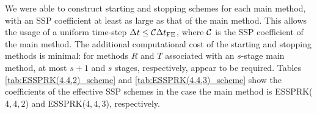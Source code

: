 We were able to construct starting and stopping schemes for each main 
method, with an SSP coefficient at least as large as that of the main method.
This allows the usage of a uniform time-step $\Delta t \leq \mathcal{C}\Delta t_{\textnormal{FE}}$, 
where $\mathcal{C}$ is the SSP coefficient of the main method.
The additional computational cost
of the starting and stopping methods is minimal:
for methods $R$ and $T$ associated with an $s$-stage main method,
at most $s + 1$ and $s$ stages, respectively, appear to be required.
Tables \ref{tab:ESSPRK(4,4,2)_scheme} and \ref{tab:ESSPRK(4,4,3)_scheme} 
show the coefficients of the effective SSP schemes in the case the main 
method is ESSPRK($4,4,2$) and ESSPRK($4,4,3$), respectively. 

